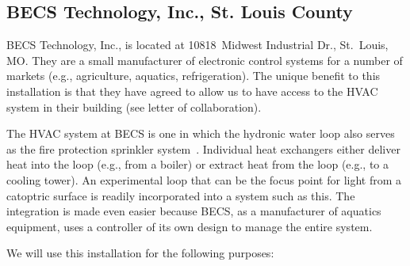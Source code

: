 \subsection{BECS Technology, Inc., St. Louis County}

BECS Technology, Inc., is located at
10818~Midwest Industrial Dr., St.~Louis, MO.
They are a small manufacturer of electronic control
systems for a number of markets (e.g., agriculture, aquatics, refrigeration).
The unique benefit to this installation is that they have agreed to
allow us to have access to the HVAC system in their building (see letter
of collaboration).

The HVAC system at BECS is one in which the hydronic water loop
also serves as the fire protection sprinkler system~\cite{Janus01,wm79}.
Individual heat exchangers either deliver heat into the loop 
(e.g., from a boiler) or extract heat from the loop (e.g., to a
cooling tower).
An experimental loop that can be the focus point for light from
a catoptric surface is readily incorporated into a system such
as this.  The integration is made even easier because BECS, as
a manufacturer of aquatics equipment, uses a controller of its own
design to manage the entire system.

We will use this installation for the following purposes:

